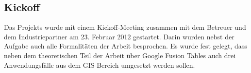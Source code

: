 \subsection{Kickoff}
Das Projekts wurde mit einem Kickoff-Meeting zusammen mit dem Betreuer und dem Industriepartner am 23. Februar 2012 gestartet. Darin wurden nebst der Aufgabe auch alle Formalitäten der Arbeit besprochen. Es wurde fest gelegt, dass neben dem theoretischen Teil der Arbeit über Google Fusion Tables auch drei Anwendungsfälle aus dem GIS-Bereich umgesetzt werden sollen.